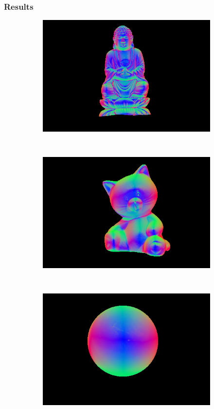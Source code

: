 \documentclass{paper}
\begin{document}
\subsubsection{Results}
\begin{figure}[h!]
        \centering
        \begin{subfigure}{0.3\textwidth}
                \includegraphics[width=\textwidth]{report_fig/buddha_n}
        \end{subfigure}
        ~ 
        \begin{subfigure}{0.3\textwidth}
                \includegraphics[width=\textwidth]{report_fig/cat_n}
        \end{subfigure}
        ~ 
        \begin{subfigure}{0.3\textwidth}
                \includegraphics[width=\textwidth]{report_fig/gray_n}

\end{subfigure}
\end{figure}
\end{document}
